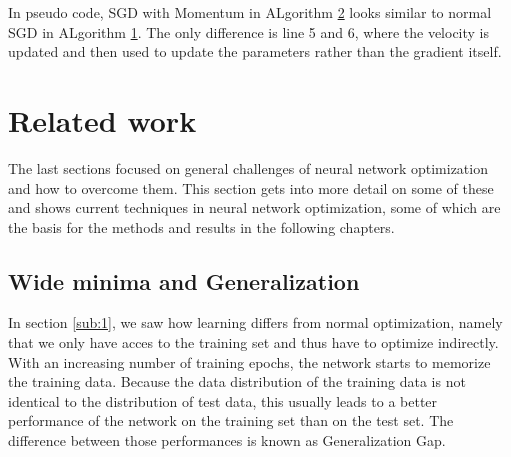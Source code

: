 In pseudo code, SGD with Momentum in ALgorithm \hyperlink{alg:SGD_Momentum}{2}
looks similar to normal SGD in ALgorithm \hyperlink{alg:SGD_Momentum}{1}. The
only difference is line 5 and 6, where the velocity is updated and then used to
update the parameters rather than the gradient itself.

\begin{comment}
Momentum also adds a regularization effect, because it is attracted to stable
or flat minima. If the minima is too small, it won't be able to stop the
momentum and therefore the SGD will move on. That's similar to a ball, which
won't stay in a small hole but keep on going, if it's speed is larger enough.
\end{comment}





\section{Related work}

The last sections focused on general challenges of neural network optimization
and how to overcome them. This section gets into more detail on some of these
and shows current techniques in neural network optimization, some of which are the basis
for the methods and results in the following chapters.




\subsection{Wide minima and Generalization}\label{sub:Generalization}
In section \ref{sub:1}, we saw how learning differs from normal optimization,
namely that we only have acces to the training set and thus have to optimize
indirectly. With an increasing number of training epochs, the network starts to
memorize the training data. Because the data distribution of the training data
is not identical to the distribution of test data, this usually leads to a
better performance of the network on the training set than on the test set. The
difference between those performances is known as Generalization Gap. 

